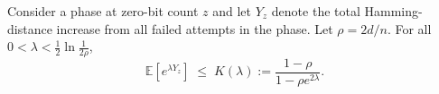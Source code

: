 %
\begin{lemma}
	Consider a phase at zero-bit count $z$ and let $Y_z$ denote the total 
	Hamming-distance increase from all failed attempts in the phase.  
	Let $\rho = 2d/n$.  
	For all $0<\lambda<\tfrac12\ln\frac{1}{2\rho}$,
	\[
	\mathbb{E}[e^{\lambda Y_z}] 
	\;\le\; 
	K(\lambda)
	:= 
	\frac{1-\rho}{1-\rho e^{2\lambda}}.
	\]
\end{lemma}

